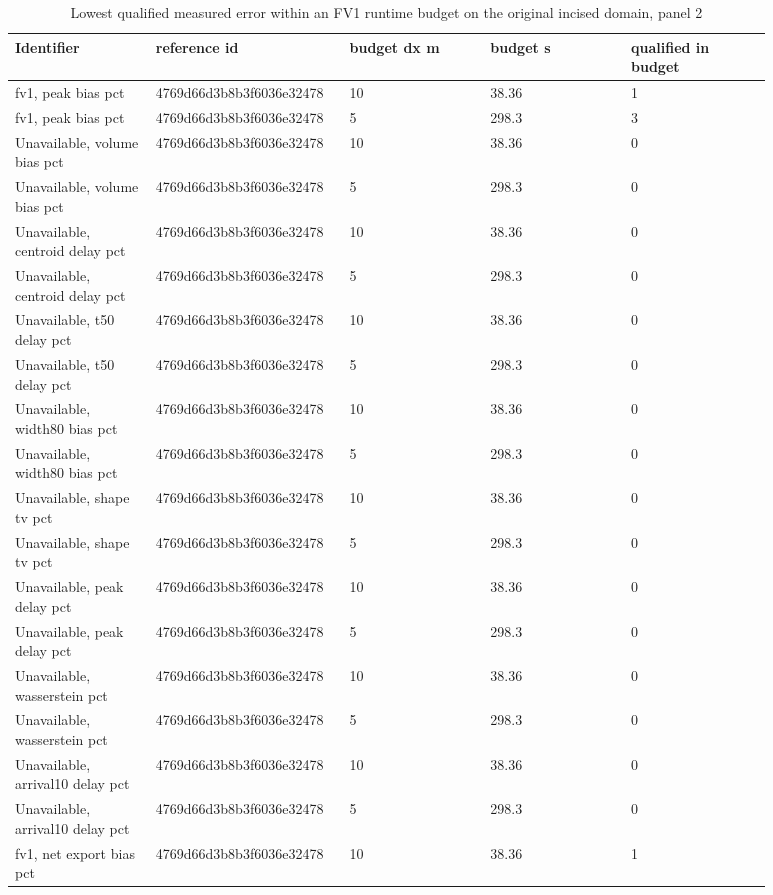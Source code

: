 \begin{longtable}{p{0.1760\linewidth}p{0.1760\linewidth}p{0.1760\linewidth}p{0.1760\linewidth}p{0.1760\linewidth}}
\caption{Lowest qualified measured error within an FV1 runtime budget on the original incised domain, panel 2}\\
\hline
Identifier & reference id & budget dx m & budget s & qualified in budget \\
\hline\endhead
fv1, peak bias pct & 4769d66d3b8b3f6036e32478 & 10 & 38.36 & 1 \\
fv1, peak bias pct & 4769d66d3b8b3f6036e32478 & 5 & 298.3 & 3 \\
Unavailable, volume bias pct & 4769d66d3b8b3f6036e32478 & 10 & 38.36 & 0 \\
Unavailable, volume bias pct & 4769d66d3b8b3f6036e32478 & 5 & 298.3 & 0 \\
Unavailable, centroid delay pct & 4769d66d3b8b3f6036e32478 & 10 & 38.36 & 0 \\
Unavailable, centroid delay pct & 4769d66d3b8b3f6036e32478 & 5 & 298.3 & 0 \\
Unavailable, t50 delay pct & 4769d66d3b8b3f6036e32478 & 10 & 38.36 & 0 \\
Unavailable, t50 delay pct & 4769d66d3b8b3f6036e32478 & 5 & 298.3 & 0 \\
Unavailable, width80 bias pct & 4769d66d3b8b3f6036e32478 & 10 & 38.36 & 0 \\
Unavailable, width80 bias pct & 4769d66d3b8b3f6036e32478 & 5 & 298.3 & 0 \\
Unavailable, shape tv pct & 4769d66d3b8b3f6036e32478 & 10 & 38.36 & 0 \\
Unavailable, shape tv pct & 4769d66d3b8b3f6036e32478 & 5 & 298.3 & 0 \\
Unavailable, peak delay pct & 4769d66d3b8b3f6036e32478 & 10 & 38.36 & 0 \\
Unavailable, peak delay pct & 4769d66d3b8b3f6036e32478 & 5 & 298.3 & 0 \\
Unavailable, wasserstein pct & 4769d66d3b8b3f6036e32478 & 10 & 38.36 & 0 \\
Unavailable, wasserstein pct & 4769d66d3b8b3f6036e32478 & 5 & 298.3 & 0 \\
Unavailable, arrival10 delay pct & 4769d66d3b8b3f6036e32478 & 10 & 38.36 & 0 \\
Unavailable, arrival10 delay pct & 4769d66d3b8b3f6036e32478 & 5 & 298.3 & 0 \\
fv1, net export bias pct & 4769d66d3b8b3f6036e32478 & 10 & 38.36 & 1 \\

\end{longtable}
